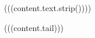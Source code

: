 

\begin{(((content.type)))}[ht]
\centering
(((content.text.strip())))
\label{(((content.id)))}
\end{(((content.type)))}
(((content.tail)))

